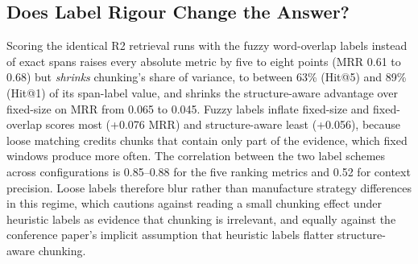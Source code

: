 \documentclass[runningheads]{llncs}
\begin{document}
\subsection{Does Label Rigour Change the Answer?}
\label{sec:labels}
Scoring the identical R2 retrieval runs with the fuzzy word-overlap labels instead of exact spans raises every absolute metric by five to eight points (MRR 0.61 to 0.68) but \emph{shrinks} chunking's share of variance, to between 63\% (Hit@5) and 89\% (Hit@1) of its span-label value, and shrinks the structure-aware advantage over fixed-size on MRR from 0.065 to 0.045. Fuzzy labels inflate fixed-size and fixed-overlap scores most (+0.076 MRR) and structure-aware least (+0.056), because loose matching credits chunks that contain only part of the evidence, which fixed windows produce more often. The correlation between the two label schemes across configurations is 0.85--0.88 for the five ranking metrics and 0.52 for context precision. Loose labels therefore blur rather than manufacture strategy differences in this regime, which cautions against reading a small chunking effect under heuristic labels as evidence that chunking is irrelevant, and equally against the conference paper's implicit assumption that heuristic labels flatter structure-aware chunking.
\end{document}

